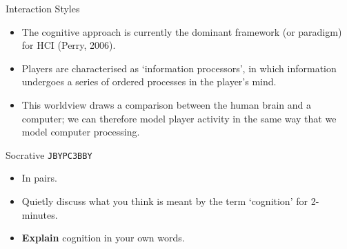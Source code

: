\begin{frame}{Interaction Styles}
	\begin{itemize}
		\item The cognitive approach is currently the dominant framework (or paradigm) for HCI (Perry, 2006).
		\item Players are characterised as `information processors', in which information undergoes a series of ordered processes
		in the player's mind.
		\item This worldview draws a comparison between the human brain and a computer; we can therefore model player activity in the same
		way that we model computer processing.
	\end{itemize}
\end{frame}

\begin{frame}[fragile]{Socrative \texttt{JBYPC3BBY}}
	\begin{itemize}
		\item In pairs.
		\item Quietly discuss what you think is meant by the term `cognition' for 2-minutes.
		\item \textbf{Explain} cognition in your own words.
	\end{itemize}
\end{frame}